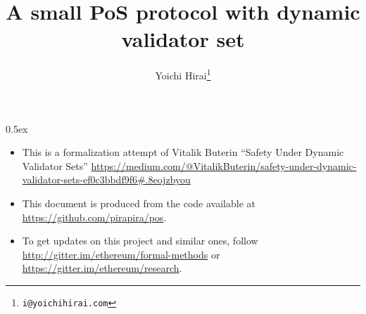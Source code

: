 \documentclass[11pt,a4paper]{article}
\begin{document}
\title{A small PoS protocol with dynamic validator set}
\author{Yoichi Hirai\footnote{\texttt{i@yoichihirai.com}}}
\maketitle

\tableofcontents

\parindent 0pt\parskip 0.5ex

\newpage

\begin{itemize}
\item This is a formalization attempt of Vitalik Buterin ``Safety Under Dynamic Validator Sets'' \url{https://medium.com/@VitalikButerin/safety-under-dynamic-validator-sets-ef0c3bbdf9f6#.8eojzbyou}
\item This document is produced from the code available at
\url{https://github.com/pirapira/pos}.
\item To get updates on this project and similar ones, follow \url{http://gitter.im/ethereum/formal-methods} or \url{https://gitter.im/ethereum/research}.
\end{itemize}



%
%
\end{document}
